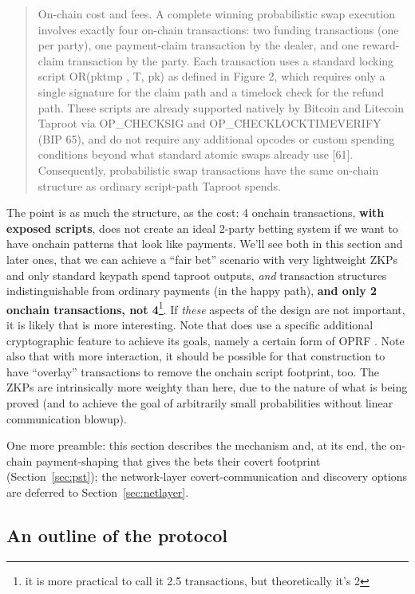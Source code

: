 \documentclass[11pt]{article}
\begin{document}
\begin{quote}
On-chain cost and fees. A complete winning probabilistic swap execution involves exactly four on-chain
transactions: two funding transactions (one per party), one payment-claim transaction by the dealer, and
one reward-claim transaction by the party. Each transaction uses a standard locking script OR(pktmp , T, pk)
as defined in Figure 2, which requires only a single signature for the claim path and a timelock check
for the refund path. These scripts are already supported natively by Bitcoin and Litecoin Taproot via
OP\_CHECKSIG and OP\_CHECKLOCKTIMEVERIFY (BIP 65), and do not require any additional opcodes or custom
spending conditions beyond what standard atomic swaps already use [61]. Consequently, probabilistic swap
transactions have the same on-chain structure as ordinary script-path Taproot spends.
\end{quote}

The point is as much the structure, as the cost: 4 onchain transactions, \textbf{with exposed scripts}, does not create an ideal 2-party betting system if we want to have onchain patterns that look like payments. We'll see both in this section and later ones, that we can achieve a ``fair bet'' scenario with very lightweight ZKPs and only standard keypath spend taproot outputs, \emph{and} transaction structures indistinguishable from ordinary payments (in the happy path), \textbf{and only 2 onchain transactions, not 4}\footnote{it is more practical to call it 2.5 transactions, but theoretically it's 2}. If \emph{these} aspects of the design are not important, it is likely that \cite{gerhardt2026} is more interesting. Note that \cite{gerhardt2026} does use a specific additional cryptographic feature to achieve its goals, namely a certain form of OPRF \cite{oprf}. Note also that with more interaction, it should be possible for that construction to have ``overlay'' transactions to remove the onchain script footprint, too. The ZKPs are intrinsically more weighty than here, due to the nature of what is being proved (and to achieve the goal of arbitrarily small probabilities without linear communication blowup).

One more preamble: this section describes the mechanism and, at its end, the on-chain payment-shaping that gives the bets their covert footprint (Section~\ref{sec:pst}); the network-layer covert-communication and discovery options are deferred to Section~\ref{sec:netlayer}.

\subsection{An outline of the protocol}
\end{document}

